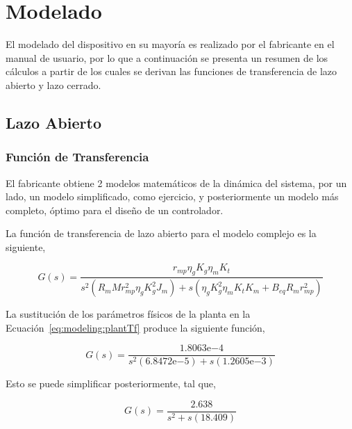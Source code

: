 \documentclass[12pt,a4paper]{article}
\newcommand{\expnum}[2]{{#1}\mathrm{e}{#2}}
\begin{document}
    \pagebreak

	  \section{Modelado}

      El modelado del dispositivo en su mayoría es realizado por el fabricante en el manual de usuario, por lo que 
      a continuación se presenta un resumen de los cálculos a partir de los cuales se derivan las funciones de 
      transferencia de lazo abierto y lazo cerrado. 

      \subsection{Lazo Abierto}  

        \subsubsection{Función de Transferencia}

        El fabricante obtiene 2 modelos matemáticos de la dinámica del sistema, por un lado, un modelo simplificado, 
        como ejercicio, y posteriormente un modelo más completo, óptimo para el diseño de un controlador. 
        
        La función de transferencia de lazo abierto para el modelo complejo es la siguiente, 
        
        \begin{equation}
          G\left(s\right) = \frac{r_{mp} \eta_{g} K_{g} \eta_{m} K_{t}}{s^{2}\left(R_{m} M r_{mp}^{2} \eta_{g} K_{g}^{2} J_{m}\right) + 
          s\left(\eta_{g} K_{g}^{2} \eta_{m} K_{t} K_{m} + B_{eq} R_{m} r_{mp}^{2}\right)}
          \label{eq:modeling:plantTf}
        \end{equation}

        La sustitución de los parámetros físicos de la planta en la Ecuación~\ref{eq:modeling:plantTf} produce la
        siguiente función, 
        
        \begin{equation}
          G\left(s\right) = \frac{\expnum{1.8063}{-4}}{s^{2}\left(\expnum{6.8472}{-5}\right) + s\left(\expnum{1.2605}{-3}\right)}
          \label{eq:modeling:openLoopTf_nosimp}
        \end{equation}

        Esto se puede simplificar posteriormente, tal que,  
        
        \begin{equation}
          G\left(s\right) = \frac{2.638}{s^{2} + s\left(18.409\right)}
          \label{eq:modeling:openloopTf_simpd}
        \end{equation}
\end{document}
